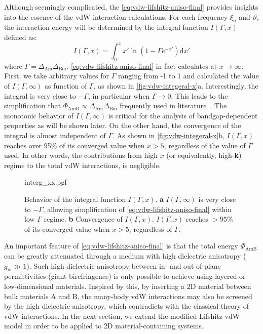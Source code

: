 Although seemingly complicated, the \autoref{eq:vdw-lifshitz-aniso-final} provides insights into the essence of the vdW interaction calculations.
For each frequency $\xi_{n}$ and $\vartheta$, the interaction energy
will be determined by the integral function $I(\Gamma, x)$ defined as:
\begin{equation}
  \label{eq:vdw-I-gamma}
  I(\Gamma, x) = \int_{0}^{x} x' \ln(1 - \Gamma e^{-x'}) \mathrm{d}x'
\end{equation}
where $\Gamma = \Delta_{\mathrm{Am}} \Delta_{\mathrm{Bm}}$. \autoref{eq:vdw-lifshitz-aniso-final} in fact calculates at $x \to \infty$.
%
First, we take arbitrary values for $\Gamma$ ranging from -1 to 1 and
calculated the value of $I(\Gamma, \infty)$ as function of $\Gamma$,
as shown in \autoref{fig:vdw-integeral-x}a. Interestingly, the
integral is very close to $-\Gamma$, in particular when
$\Gamma \to 0$. This leads to the simplification that
$\Phi_{\mathrm{AmB}} \propto \Delta_{\mathrm{Am}}
\Delta_{\mathrm{Bm}}$ frequently used in
literature~\cite{parsegian_van_2010_book,Rajter_2007_vdW,Dryden_2015_gecko}.
%
The monotonic behavior of $I(\Gamma, \infty)$ is
critical for the analysis of bandgap-dependent properties as will be
shown later.
%
On the other hand, the convergence of the integral is almost
independent of $\Gamma$. As shown in \autoref{fig:vdw-integeral-x}b,
$I(\Gamma, x)$ reaches over 95\% of its converged value when $x > 5$,
regardless of the value of $\Gamma$ used.
%
In other words, the contributions from high $x$ (or equivalently,
high-{\bfseries k}) regime to the total vdW interactions, is
negligible.

\begin{figure}[!htbp]
  \centering{}
  {interg_xx.pgf}
  \caption{\label{fig:vdw-integeral-x}%
    Behavior of the integral function $I(\Gamma, x)$. {\bfseries a}
    $I(\Gamma, \infty)$ is very close to $-\Gamma$, allowing
    simplification of \autoref{eq:vdw-lifshitz-aniso-final} within low
    $\Gamma$ regime. {\bfseries b} Convergence of $I(\Gamma,
    x)$. $I(\Gamma, x)$ reaches $>95$\% of its converged value when
    $x>5$, regardless of $\Gamma$.}
\end{figure}

An important feature of \autoref{eq:vdw-lifshitz-aniso-final} is that
the total energy $\Phi_{\mathrm{AmB}}$ can be greatly attenuated
through a medium with high dielectric anisotropy (\ie
$g_{\mathrm{m}} \gg 1$).
%
Such high dielectric anisotropy between in- and out-of-plane
permittivities (giant birefringence) is only possible to achieve using
layered \cite{Collin_1958_aniso,Weber_2000_aniso} or low-dimensional
\cite{Niu_2018_aniso,Segura_2018_aniso} materials. Inspired by this,
by inserting a 2D material between bulk materials A and B, the
many-body vdW interactions may also be
screened by the high dielectric anisotropy, which contradicts with the classical theory of vdW interactions.
%
In the next section, we extend the modified Lifshitz-vdW model in
order to be applied to 2D material-containing systems.


